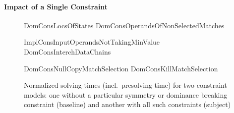 \paragraph{Impact of a Single Constraint}


\begin{figure}
  \centering

                      {DomConsLocsOfStates}%
  \hfill%
                      {DomConsOperandsOfNonSelectedMatches}

  \vspace{\betweensubfigures}

                      {ImplConsInputOperandsNotTakingMinValue}%
  \hfill%
                      {DomConsInterchDataChains}

  \vspace{\betweensubfigures}

                      {DomConsNullCopyMatchSelection}%
  \hfill%
                      {DomConsKillMatchSelection}

  \caption[%
            Set of plots for evaluating each symmetry or dominance breaking
            constraint's impact on solving time%
          ]%
          {%
            Normalized solving times (incl.\ presolving time) for two
            constraint models: one without a particular symmetry or dominance
            breaking constraint (baseline) and another with all such
            constraints (subject)%
          }
\end{figure}


